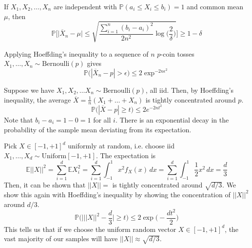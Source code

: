     \begin{corollary}
      If $X_1, X_2, \ldots, X_n$ are independent with $\mathbb{P}(a_i \leq X_i \leq b_i) = 1$ and common mean $\mu$, then 
      \begin{equation}
        \mathbb{P}\bigg[ \big| \overline{X}_n - \mu \big| \leq \sqrt{ \frac{\sum_{i=1}^n (b_i - a_i)^2}{2n^2} \log \Big(\frac{2}{\delta}\Big)} \bigg] \geq 1 - \delta
      \end{equation}
    \end{corollary}

    \begin{example}[Bernoulli]
      Applying Hoeffding's inequality to a sequence of $n$ $p$-coin tosses $X_1, \ldots, X_n \sim \mathrm{Bernoulli}(p)$ gives 
      \begin{equation}
        \mathbb{P}\big( | \overline{X}_n - p | > \epsilon \big) \leq 2 \exp^{-2 n \epsilon^2}
      \end{equation}
    \end{example}

    \begin{example}[Mean]
      Suppose we have $X_1, X_2, \ldots X_n \sim \mathrm{Bernoulli}(p)$, all iid. Then, by Hoeffding's inequality, the average $\overline{X} = \frac{1}{n} (X_1 + \ldots + X_n)$ is tightly concentrated around $p$. 
      \begin{equation}
        \mathbb{P} \big( | \overline{X} - p | \geq t \big) \leq 2 e^{-2 n t^2}
      \end{equation}
      Note that $b_i - a_i = 1 - 0 = 1$ for all $i$. There is an exponential decay in the probability of the sample mean deviating from its expectation. 
    \end{example}

    \begin{example}[Hypercube]
      Pick $X \in [-1, +1]^d$ uniformly at random, i.e. choose iid $X_1,\ldots, X_d \sim \mathrm{Uniform}[-1, +1]$. The expectation is 
      \begin{equation}
        \mathbb{E} ||X||^2 = \sum_{i=1}^d \mathbb{E} X_i^2 = \sum_{i=1}^d \int_{-1}^1 x^2 f_X (x) \,dx = \sum_{i=1}^d \int_{-1}^1 \frac{1}{2} x^2 \,dx = \frac{d}{3}
      \end{equation}
      Then, it can be shown that $||X|| = $ is tightly concentrated around $\sqrt{d/3}$. We show this again with Hoeffding's inequality by showing the concentration of $||X||^2$ around $d/3$. 
      \begin{equation}
        \mathbb{P} \bigg( \bigg| ||X||^2 - \frac{d}{3} \bigg| \geq t \bigg) \leq 2 \exp \Big( - \frac{ d t^2}{2} \Big)
      \end{equation}
      This tells us that if we choose the uniform random vector $X \in [-1, +1]^d$, the vast majority of our samples will have $||X|| \approx \sqrt{d/3}$. 
    \end{example}


